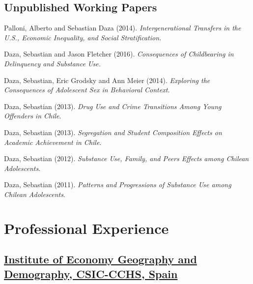 \documentclass[10pt,letterpaper]{article}
\renewenvironment{itemize}{
  \begin{list}{}{
    \setlength{\leftmargin}{1.5em}
    \setlength{\itemsep}{0.25em}
    \setlength{\parskip}{0pt}
    \setlength{\parsep}{0.25em}
  }
}{
  \end{list}
}
\begin{document}
\subsection*{Unpublished Working Papers}

\begin{itemize}

\item Palloni, Alberto and Sebastian Daza (2014).
   \textit{Intergenerational Transfers in the U.S., Economic Inequality, and Social Stratification.}

\item Daza, Sebastian and Jason Fletcher (2016).
  \textit{Consequences of Childbearing in Delinquency and Substance Use.}

\item Daza, Sebastian, Eric Grodsky and Ann Meier (2014).
  \textit{Exploring the Consequences of Adolescent Sex in Behavioral Context.}

\item Daza, Sebastian (2013).
  \textit{Drug Use and Crime Transitions Among Young Offenders in Chile}.

\item Daza, Sebastian (2013).
  \textit{Segregation and Student Composition Effects on Academic Achievement in Chile}.

\item Daza, Sebastian (2012).
  \textit{Substance Use, Family, and Peers Effects among Chilean Adolescents}.

\item Daza, Sebastian (2011).
  \textit{Patterns and Progressions of Substance Use among Chilean Adolescents}.

\end{itemize}

\section*{Professional Experience}

\subsection*{\href{http://iegd.csic.es/}{Institute of Economy Geography and Demography, CSIC-CCHS, Spain}}
\end{document}

